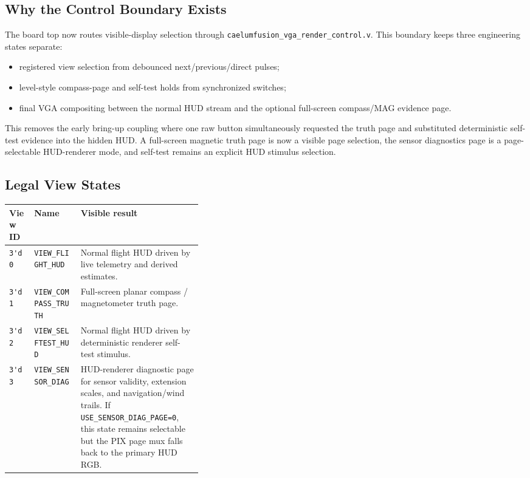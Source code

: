 \documentclass{article}
\newcommand{\sig}[1]{\begingroup\nolinkurl{#1}\endgroup}
\newcommand{\file}[1]{\begingroup\nolinkurl{#1}\endgroup}
\newcommand{\param}[1]{\begingroup\nolinkurl{#1}\endgroup}
\begin{document}
\subsection{Why the Control Boundary Exists}

The board top now routes visible-display selection through
\file{caelumfusion_vga_render_control.v}.  This boundary keeps three engineering
states separate:

\begin{itemize}
  \item registered view selection from debounced next/previous/direct pulses;
  \item level-style compass-page and self-test holds from synchronized switches;
  \item final VGA compositing between the normal HUD stream and the optional
        full-screen compass/MAG evidence page.
\end{itemize}

This removes the early bring-up coupling where one raw button simultaneously
requested the truth page and substituted deterministic self-test evidence into
the hidden HUD.  A full-screen magnetic truth page is now a visible page
selection, the sensor diagnostics page is a page-selectable HUD-renderer mode,
and self-test remains an explicit HUD stimulus selection.

\subsection{Legal View States}

\begin{center}
\begin{tabularx}{\linewidth}{p{0.13\linewidth} p{0.24\linewidth} X}
\toprule
\textbf{View ID} & \textbf{Name} & \textbf{Visible result} \\
\midrule
\sig{3'd0} & \sig{VIEW_FLIGHT_HUD} &
Normal flight HUD driven by live telemetry and derived estimates. \\
\sig{3'd1} & \sig{VIEW_COMPASS_TRUTH} &
Full-screen planar compass / magnetometer truth page. \\
\sig{3'd2} & \sig{VIEW_SELFTEST_HUD} &
Normal flight HUD driven by deterministic renderer self-test stimulus. \\
\sig{3'd3} & \sig{VIEW_SENSOR_DIAG} &
HUD-renderer diagnostic page for sensor validity, extension scales, and
navigation/wind trails.  If \param{USE_SENSOR_DIAG_PAGE=0}, this state remains
selectable but the PIX page mux falls back to the primary HUD RGB. \\
\bottomrule
\end{tabularx}
\end{center}
\end{document}
